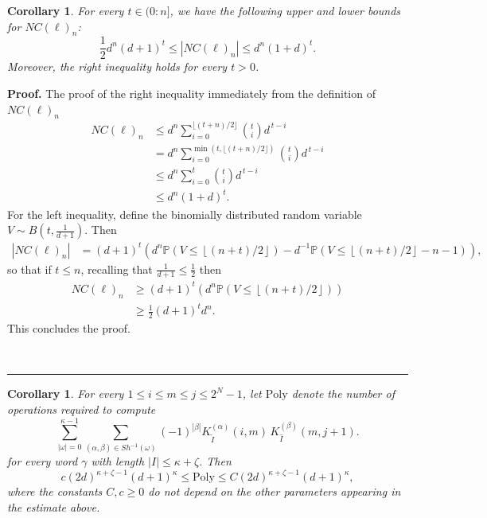 \documentclass{article}%
\newtheorem{corollary}[theorem]{Corollary}
\newenvironment{proof}[1][Proof]{\noindent\textbf{#1.} }{\ \rule{0.5em}{0.5em}}
\newcommand{\floor}[1]{\left \lfloor {#1}\right \rfloor}
\begin{document}
\begin{corollary}
For every $t \in (0 : n]$, we have the following upper and lower bounds for $NC(\ell)_n$:
\[
 \frac{1}{2} d^n (d+1)^t
\leq | NC(\ell)_n |
\leq d^n (1+d)^t.
\]
Moreover,  the right inequality holds for every $t > 0$.
\end{corollary}

\begin{proof}
The proof of the right inequality immediately from the definition of $NC(\ell)_n$
\begin{align*}
NC(\ell)_n
&\leq d^n \sum_{i=0}^{\lfloor (t+n)/2 \rfloor}
\binom{t}{i} d^{\,t-i} \\
&= d^n \sum_{i=0}^{\min\left(t, \lfloor (t+n)/2 \rfloor\right)}
\binom{t}{i} d^{\,t-i} \\
&\leq d^n \sum_{i=0}^{t}
\binom{t}{i} d^{\,t-i} \\
&\leq d^n (1+d)^t.
\end{align*}
For the left inequality, define the binomially distributed random variable $V \sim B(t, \frac{1}{d+1})$. Then
\begin{align*}
    |NC(\ell)_n| &= (d+1)^t\left( d^n \mathbb{P}(V \leq \floor{(n+t)/2}) - d^{-1} \mathbb{P}(V \leq \floor{(n+t)/2} - n - 1) \right),
\end{align*}
so that if $t \leq n$, recalling that $\frac{1}{d+1} \leq \frac{1}{2}$ then
\begin{align*}
    NC(\ell)_n &\geq (d+1)^t\left( d^n \mathbb{P}(V \leq \floor{(n+t)/2})\right)\\
    &\geq \frac{1}{2} (d+1)^t  d^n .
\end{align*}
This concludes the proof.

\end{proof}

\begin{corollary}
For every $1 \le i \le m \le j \le 2^N - 1$, let $\mathrm{Poly}$ denote the number of operations required to compute
\[
\sum_{|\omega| = 0}^{\kappa-1} \sum_{(\alpha, \beta) \in Sh^{-1}(\omega)} (-1)^{|\beta|}  
K^{(\alpha)}_{\tilde{I}}(i,m)\, K^{(\beta)}_{\hat{I}}(m,j+1).
\]
for every word $\gamma$ with length $|I| \leq \kappa + \zeta$.\newline
Then 
\[
c
(2d)^{\kappa + \zeta-1} (d+1)^\kappa \leq  \mathrm{Poly} \leq C
(2d)^{\kappa + \zeta-1} (d+1)^\kappa,
\]
where the constants $C, c \geq 0$ do not depend on the other parameters appearing in the estimate above.
\end{corollary}
\end{document}
